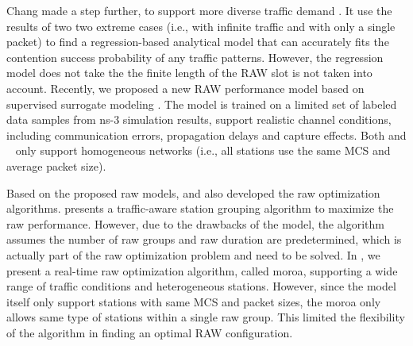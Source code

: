 Chang  made a step further, to support more diverse traffic demand \cite{Chang2018}. It use the results of two two extreme cases (i.e., with infinite traffic and with only a single packet) to find a regression-based analytical model that can accurately fits the contention success probability of any traffic patterns. However, the regression model does not take the the finite length of the RAW slot is not taken into account.
 Recently, we proposed a new RAW performance model based on supervised surrogate modeling \cite{wowmom2018}. The model is trained on a limited set of labeled data samples from ns-3 simulation results, support realistic channel conditions, including communication errors, propagation delays and capture effects. Both \cite{Chang2018} and ~\cite{wowmom2018} only support homogeneous networks (i.e., all stations use the same MCS and average packet size). 


Based on the proposed \gls{raw} models, \cite{Chang2018} and \cite{wowmom2018} also developed the \gls{raw} optimization algorithms.  \cite{Chang2018} presents a traffic-aware station grouping algorithm to maximize the \gls{raw} performance. However, due to the drawbacks of the model, the algorithm assumes the number of \gls{raw} groups and \gls{raw} duration are predetermined, which is actually part of the \gls{raw} optimization problem and need to be solved.
In \cite{wowmom2018}, we present a real-time \gls{raw} optimization algorithm, called \gls{moroa}, supporting a wide range of traffic conditions and heterogeneous stations. However, since the model itself only support stations with same MCS and  packet sizes, the \gls{moroa} only allows same type of stations within a single \gls{raw} group. This limited the flexibility of the algorithm in finding an optimal RAW configuration.






